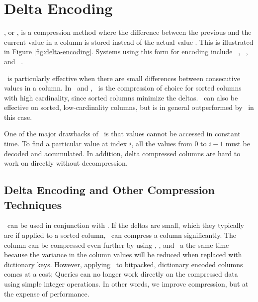 \section{Delta Encoding}
\label{sec:Delta Encoding}


\dele, or , is a compression method where the difference between the previous and the current value in a column is stored instead of the actual value \cite{Wikipedia_contributors2015-cb}. This is illustrated in Figure \ref{fig:delta-encoding}.  Systems using this form for encoding include \vertica~\cite{Lamb2012-kg}, \cstore~\cite{Stonebraker2005-qz}, and \blink~\cite{Raman2008-gi}. 

\dele~is particularly effective when there are small differences between consecutive values in a column. In \cstore~and \vertica, \dele~is the compression of choice for sorted columns with high cardinality, since sorted columns minimize the deltas. \dele~can also be effective on sorted, low-cardinality columns, but is in general outperformed by \rle~in this case.

One of the major drawbacks of \dele~is that values cannot be accessed in constant time. To find a particular value at index $i$, all the values from $0$ to $i - 1$ must be decoded and accumulated. In addition, delta compressed columns are hard to work on directly without decompression.

\subsection{Delta Encoding and Other Compression Techniques}
\label{sub:Delta Encoding and Other Compression Techniques}
\bp~can be used in conjunction with \dele. If the deltas are small, which they typically are if applied to a sorted column, \bp~can compress a column significantly. The column can be compressed even further by using \de, \dele, and \bp~a the same time because the variance in the column values will be reduced when replaced with dictionary keys. However, applying \dele~to bitpacked, dictionary encoded columns comes at a cost; Queries can no longer work directly on the compressed data using simple integer operations. In other words, we improve compression, but at the expense of performance.


